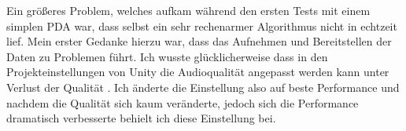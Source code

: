 Ein größeres Problem, welches aufkam während den ersten Tests mit einem simplen PDA war, dass selbst ein sehr rechenarmer Algorithmus nicht in echtzeit lief. Mein erster Gedanke hierzu war, dass das Aufnehmen und Bereitstellen der Daten zu Problemen führt. Ich wusste glücklicherweise 
dass in den Projekteinstellungen von Unity die Audioqualität angepasst werden kann unter Verlust der Qualität \cite{TODO}. Ich änderte die Einstellung also auf beste Performance und nachdem die Qualität sich kaum veränderte, jedoch sich die Performance dramatisch verbesserte behielt ich diese Einstellung bei.


%
%




